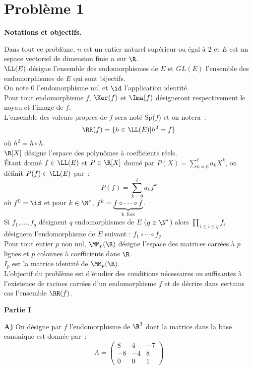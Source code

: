 \documentclass[twoside,french,11pt]{VcCours}
\renewcommand{\l}{\LL(E)}
\begin{document}
\section*{Problème 1}
\centerline{\bf Notations et objectifs.}
\bigskip
Dans tout ce problème, $n$ est un entier naturel supérieur ou égal à $2$ et $E$ est un espace vectoriel de dimension finie $n$ sur $\R$.\\
$\l$ désigne l'ensemble des endomorphismes de $E$ et $GL(E)$ l'ensemble des endomorphismes de $E$ qui sont bijectifs.\\
On note $0$ l'endomorphisme nul et $\id$ l'application identité.\\
Pour tout endomorphisme $f$, $\Ker (f)$ et $\Ima(f)$ désigneront respectivement le noyau et l'image de $f$.\\
L'ensemble des valeurs propres de $f$ sera noté Sp($f$) et on notera~:
$$
\RR(f)= \{h \in \l | h^2=f \}
$$
où $h^2=h \circ h$.\\
$\R[X]$ désigne l'espace des polynômes à coefficients réels.\\
Étant donné $f \in \l$ et $P \in \R[X]$ donné par $P(X)= \sum_{k=0}^{\ell} a_k X^k$, on définit $P(f) \in \l$ par~:
$$
P(f)=\sum_{k=0}^\ell a_k f^k
$$
o\`u $f^0=\id$ et pour $k \in \N^*$, $f^k=\underset{\rm k \ fois} {\underbrace{f \circ \cdots \circ f}}$.\\
Si $f_1,\ldots,f_q$ désignent $q$ endomorphismes de $E$ ($q \in \N^*$) alors $\prod_{1 \le i \le q} f_i$ désignera l'endomorphisme de $E$ suivant : $f_1 \circ \cdots \circ f_q$.\\
Pour tout entier $p$ non nul, $\MM_p(\R)$ désigne l'espace des matrices carrées à $p$ lignes et $p$ colonnes à coefficients dans $\R$.\\
$I_p$ est la matrice identité de $\MM_p(\R)$.\\
L'objectif du problème est d'étudier des conditions nécessaires ou suffisantes à l'existence de racines carrées d'un endomorphisme $f$ et de décrire dans certains cas l'ensemble $\RR(f)$. 



\vskip 1.8cm
\centerline{\bf Partie I}
\bigskip
{\bf A)} On désigne par $f$ l'endomorphisme de $\R^3$ dont la matrice dans la base canonique est donnée par~:
$$
A=
\begin{pmatrix}
8 & 4 & -7 \\
-8 & -4 & 8 \\
0 & 0 & 1
\end{pmatrix}
$$
\end{document}
